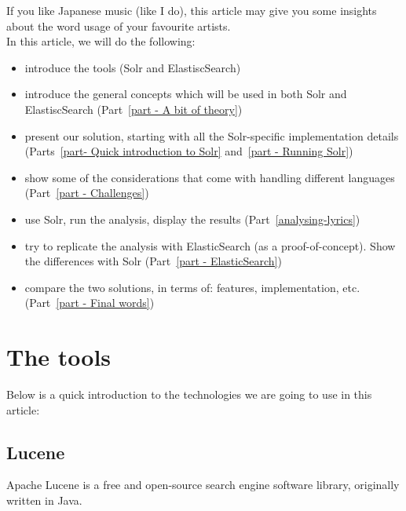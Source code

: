 If you like Japanese music (like I do), this article may give you some insights about the word usage of your favourite artists. \\


In this article, we will do the following:
\begin{itemize}
	\item introduce the tools (Solr and ElastiscSearch)
	
	\item introduce the general concepts which will be used in both Solr and ElastiscSearch (Part~\ref{part - A bit of theory})
	
	\item present our solution, starting with all the Solr-specific implementation details  (Parts~\ref{part- Quick introduction to Solr} and~\ref{part - Running Solr})
	
	\item show some of the considerations that come with handling different languages (Part~\ref{part - Challenges})
	
	\item use Solr, run the analysis, display the results (Part~\ref{analysing-lyrics})
	
	\item try to replicate the analysis with ElasticSearch (as a proof-of-concept). Show the differences with Solr (Part~\ref{part - ElasticSearch})
	
	\item compare the two solutions, in terms of: features, implementation, etc. (Part~\ref{part - Final words})
\end{itemize}

\bigskip


\newpage



\section{The tools}

Below is a quick introduction to the technologies we are going to use in this article:

\subsection{Lucene}

Apache Lucene is a free and open-source search engine software library, originally written in Java. \\

